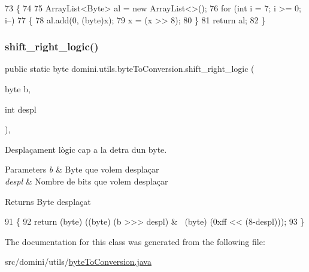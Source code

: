 \begin{DoxyCode}
73     \{
74 
75         ArrayList<Byte> al = \textcolor{keyword}{new} ArrayList<>();
76         \textcolor{keywordflow}{for} (\textcolor{keywordtype}{int} i = 7; i >= 0; i--)
77         \{
78             al.add(0, (byte)x);
79             x = (x >> 8);  
80         \}
81         \textcolor{keywordflow}{return} al;
82     \}
\end{DoxyCode}
\mbox{\label{classdomini_1_1utils_1_1byteToConversion_a0e232cb9d272ccc13accda58bab9f8e1}} 
\subsubsection{\texorpdfstring{shift\+\_\+right\+\_\+logic()}{shift\_right\_logic()}}
{\footnotesize\ttfamily public static byte domini.\+utils.\+byte\+To\+Conversion.\+shift\+\_\+right\+\_\+logic (\begin{DoxyParamCaption}\item[{byte}]{b,  }\item[{int}]{despl }\end{DoxyParamCaption})\hspace{0.3cm}{\ttfamily [inline]}, {\ttfamily [static]}}



Desplaçament lògic cap a la detra d\textquotesingle{}un byte. 


\begin{DoxyParams}{Parameters}
{\em b} & Byte que volem desplaçar \\
\hline
{\em despl} & Nombre de bits que volem desplaçar \\
\hline
\end{DoxyParams}
\begin{DoxyReturn}{Returns}
Byte desplaçat 
\end{DoxyReturn}

\begin{DoxyCode}
91                                                             \{
92         \textcolor{keywordflow}{return} (byte) ((byte) (b >>> despl) &~ (byte) (0xff << (8-despl)));
93     \}
\end{DoxyCode}


The documentation for this class was generated from the following file\+:\begin{DoxyCompactItemize}
\item 
src/domini/utils/\hyperlink{byteToConversion_8java}{byte\+To\+Conversion.\+java}\end{DoxyCompactItemize}
